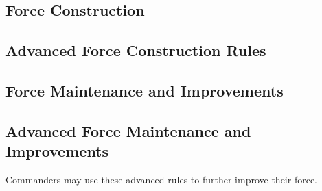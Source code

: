 

\subsection{Force Construction}
\label{subsec:force_construction}



\newpage



\newpage

\subsection{Advanced Force Construction Rules}





\subsection{Force Maintenance and Improvements}
\label{subsec:force_maintenance}



\newpage

\subsection{Advanced Force Maintenance and Improvements}

Commanders may use these advanced rules to further improve their force.

